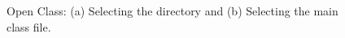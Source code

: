 \begin{figure}[!ht]
\begin{center}
\qquad
{}
\caption{Open Class: (a) Selecting the directory and (b) Selecting
the main class file.}\label{fig-jabuti-open-class}
\end{center}
\end{figure}
